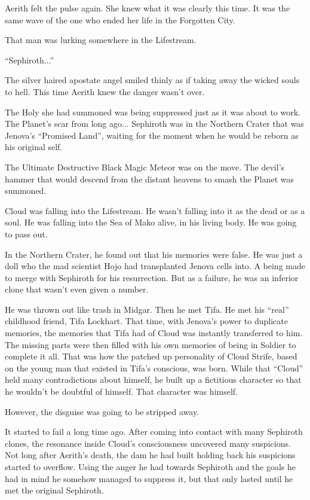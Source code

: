 \documentclass[oneside]{book}
\begin{document}
Aerith felt the pulse again. She knew what it was clearly this time. It was the same wave of the one who ended her life in the Forgotten City.

That man was lurking somewhere in the Lifestream.

“Sephiroth...”

The silver haired apostate angel smiled thinly as if taking away the wicked souls to hell. This time Aerith knew the danger wasn't over.

The Holy she had summoned was being suppressed just as it was about to work. The Planet's scar from long ago... Sephiroth was in the Northern Crater that was Jenova's “Promised Land”, waiting for the moment when he would be reborn as his original self.

The Ultimate Destructive Black Magic Meteor was on the move. The devil's hammer that would descend from the distant heavens to smash the Planet was summoned.

\newpage
Cloud was falling into the Lifestream. He wasn't falling into it as the dead or as a soul. He was falling into the Sea of Mako alive, in his living body. He was going to pass out.

In the Northern Crater, he found out that his memories were false. He was just a doll who the mad scientist Hojo had transplanted Jenova cells into. A being made to merge with Sephiroth for his resurrection. But as a failure, he was an inferior clone that wasn't even given a number.

He was thrown out like trash in Midgar. Then he met Tifa. He met his “real” childhood friend, Tifa Lockhart. That time, with Jenova's power to duplicate memories, the memories that Tifa had of Cloud was instantly transferred to him. The missing parts were then filled with his own memories of being in Soldier to complete it all. That was how the patched up personality of Cloud Strife, based on the young man that existed in Tifa's conscious, was born. While that “Cloud” held many contradictions about himself, he built up a fictitious character so that he wouldn't be doubtful of himself. That character was himself.

However, the disguise was going to be stripped away.

It started to fail a long time ago. After coming into contact with many Sephiroth clones, the resonance inside Cloud's consciousness uncovered many suspicions. Not long after Aerith's death, the dam he had built holding back his suspicions started to overflow. Using the anger he had towards Sephiroth and the goals he had in mind he somehow managed to suppress it, but that only lasted until he met the original Sephiroth.
\end{document}
